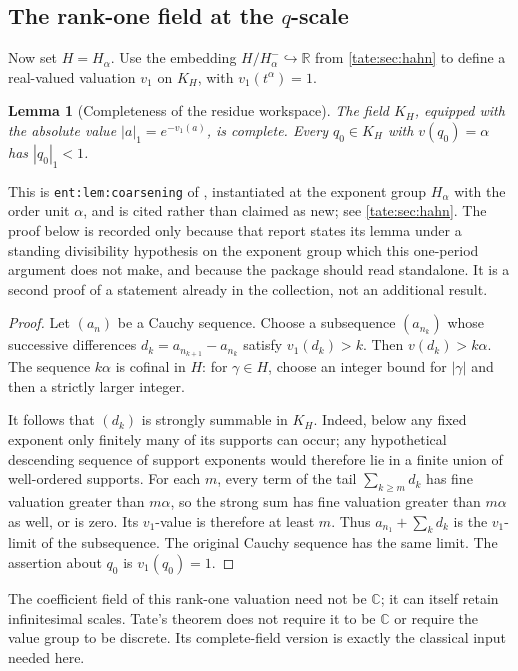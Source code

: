 \documentclass[11pt,letterpaper]{article}
\newtheorem{lemma}[lemma]{Lemma}
\theoremstyle{definition}
\newcommand{\C}{\mathbb C}
\newcommand{\R}{\mathbb R}
\begin{document}
\subsection{The rank-one field at the \texorpdfstring{$q$}{q}-scale}

Now set $H=H_\alpha$. Use the embedding
$H/H_\alpha^-\hookrightarrow\R$ from \cref{tate:sec:hahn} to define a
real-valued valuation $v_1$ on $K_H$, with $v_1(t^\alpha)=1$.

\begin{lemma}[Completeness of the residue workspace]\label{tate:lem:rank-one}
The field $K_H$, equipped with the absolute value $|a|_1=e^{-v_1(a)}$,
is complete. Every $q_0\in K_H$ with $v(q_0)=\alpha$ has $|q_0|_1<1$.
\end{lemma}

This is \texttt{ent:lem:coarsening} of \cite{RepoEntire}, instantiated at
the exponent group $H_\alpha$ with the order unit $\alpha$, and is cited
rather than claimed as new; see \cref{tate:sec:hahn}. The proof below is
recorded only because that report states its lemma under a standing
divisibility hypothesis on the exponent group which this one-period
argument does not make, and because the package should read standalone. It is a second
proof of a statement already in the collection, not an additional result.

\begin{proof}
Let $(a_n)$ be a Cauchy sequence. Choose a subsequence $(a_{n_k})$ whose
successive differences $d_k=a_{n_{k+1}}-a_{n_k}$ satisfy $v_1(d_k)>k$.
Then $v(d_k)>k\alpha$. The sequence $k\alpha$ is cofinal in $H$:
for $\gamma\in H$, choose an integer bound for $|\gamma|$ and then a
strictly larger integer.

It follows that $(d_k)$ is strongly summable in $K_H$. Indeed, below any
fixed exponent only finitely many of its supports can occur; any
hypothetical descending sequence of support exponents would therefore
lie in a finite union of well-ordered supports. For each $m$, every term of the tail $\sum_{k\ge m}d_k$ has
fine valuation greater than $m\alpha$, so the strong sum has fine
valuation greater than $m\alpha$ as well, or is zero. Its $v_1$-value
is therefore at least $m$. Thus
$a_{n_1}+\sum_kd_k$ is the $v_1$-limit of the subsequence. The original
Cauchy sequence has the same limit. The assertion about $q_0$ is
$v_1(q_0)=1$.
\end{proof}

The coefficient field of this rank-one valuation need not be $\C$;
it can itself retain infinitesimal scales. Tate's theorem does not
require it to be $\C$ or require the value group to be discrete.
Its complete-field version is exactly the classical input needed here.
\end{document}
